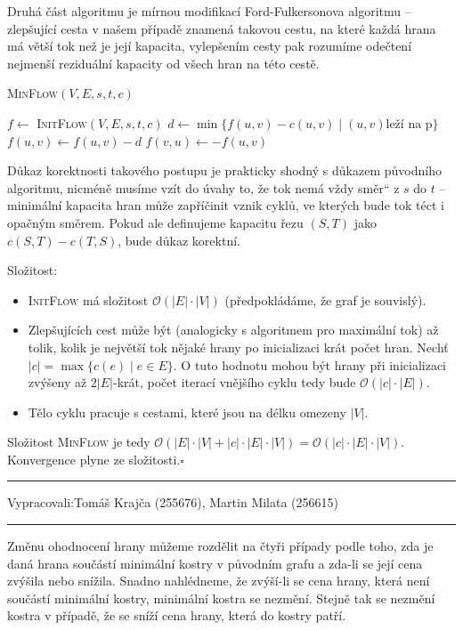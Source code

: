 \documentclass[12pt]{article}
\newcommand{\la}{\leftarrow}
\newcommand{\uv}[1]{\quotedblbase #1\textquotedblleft}
\renewcommand{\O}{\mathcal{O}}
\newcommand{\zadani}[2]{
{\large
\noindent {\bf IB108 \hfill{} Sada #1, Příklad #2 \\[-4mm]}
\noindent\hrule
\vspace{2mm}
\noindent Vypracovali:\hfill{}Tomáš Krajča (255676), Martin Milata (256615)
\vspace{3mm}
\hrule
\bigskip\bigskip}
}
\begin{document}
\noindent
Druhá část algoritmu je mírnou modifikací Ford-Fulkersonova algoritmu -- zlepšující cesta v
našem případě znamená takovou cestu, na které každá hrana má větší tok než je její kapacita,
vylepšením cesty pak rozumíme odečtení nejmenší reziduální kapacity od všech hran na této cestě.

\begin{algorithm}
\textsc{MinFlow}$(V,E,s,t,c)$
\begin{algorithmic}
\STATE $f \la $ \textsc{InitFlow}$(V,E,s,t,c)$
\STATE $d \la \min\{f(u,v) - c(u,v) \mid (u,v) \text{leží na p}\}$
\STATE $f(u,v) \la f(u,v) - d$
\STATE $f(v,u) \la -f(u,v)$
\ENDFOR
\ENDWHILE
\end{algorithmic}
\end{algorithm}

Důkaz korektnosti takového postupu je prakticky shodný s důkazem původního algoritmu, nicméně musíme
vzít do úvahy to, že tok nemá vždy \uv{směr} z $s$ do $t$ -- minimální kapacita hran může zapříčinit
vznik cyklů, ve kterých bude tok téct i opačným směrem. Pokud ale definujeme kapacitu řezu
$(S,T)$ jako $c(S,T) - c(T,S)$, bude důkaz korektní.

\noindent
Složitost:
\begin{itemize}
\item \textsc{InitFlow} má složitost $\O(|E|\cdot|V|)$ (předpokládáme, že graf je souvislý).
\item Zlepšujících cest může být (analogicky s algoritmem pro maximální tok) až tolik, kolik je
největší tok nějaké hrany po inicializaci krát počet hran.  Nechť $|c| = \max\{c(e) \mid e \in E\}$. O tuto hodnotu mohou být
hrany při inicializaci zvýšeny až $2|E|$-krát, počet iterací vnějšího cyklu tedy bude $\O(|c|\cdot|E|)$.
\item Tělo cyklu pracuje s cestami, které jsou na délku omezeny $|V|$.
\end{itemize}
Složitost \textsc{MinFlow} je tedy $\O(|E|\cdot|V| + |c|\cdot|E|\cdot|V|) =
\O(|c|\cdot|E|\cdot|V|)$. Konvergence plyne ze složitosti.\hfill$\square$



\clearpage
\zadani{3}{4}

\noindent
Změnu ohodnocení hrany můžeme rozdělit na čtyři případy podle toho, zda je daná hrana součástí
minimální kostry v původním grafu a zda-li se její cena zvýšila nebo snížila.  Snadno nahlédneme, že
zvýší-li se cena hrany, která není součástí minimální kostry, minimální kostra se nezmění. Stejně
tak se nezmění kostra v případě, že se sníží cena hrany, která do kostry patří.
\end{document}
